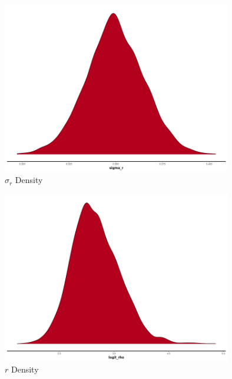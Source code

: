 \documentclass[11pt]{article}
\begin{document}
\begin{figure}[h!] 
	\centering
  \includegraphics[height=75mm]{density_sigma_r.png}
  \caption{$\sigma_r$ Density}
  \label{fig:dsigma_r}
\end{figure}

\begin{figure}[h!] 
	\centering
  \includegraphics[height=75mm]{density_logit_rho.png}
  \caption{$r$ Density}
  \label{fig:dlogit_rho}
\end{figure}












\newpage


\end{document}
